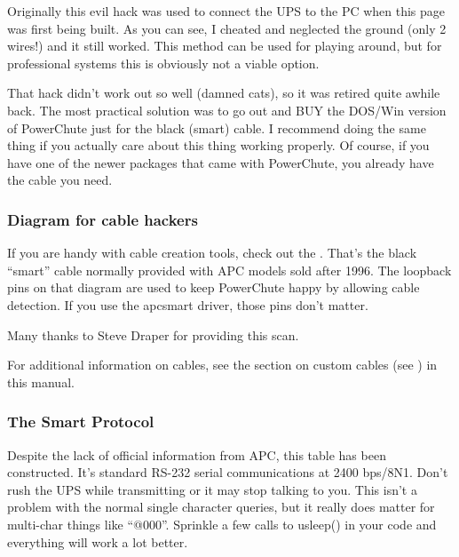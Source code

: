 {{{{{{{{{{{{{{{{{Originally this evil hack was used to connect the UPS to the PC when this page
was first being built. As you can see, I cheated and neglected the ground
(only 2 wires!) and it still worked. This method can be used for playing
around, but for professional systems this is obviously not a viable option.  

That hack didn't work out so well (damned cats), so it was retired quite
awhile back. The most practical solution was to go out and BUY the DOS/Win
version of PowerChute just for the black (smart) cable. I recommend doing the
same thing if you actually care about this thing working properly. Of course,
if you have one of the newer packages that came with PowerChute, you already
have the cable you need. 

\label{Diagram-for-cable-hackers}

\subsubsection*{Diagram for cable hackers}

If you are handy with cable creation tools, check out the 
. That's the black
``smart'' cable normally provided with APC models sold after 1996. The
loopback pins on that diagram are used to keep PowerChute happy by allowing
cable detection. If you use the 
 apcsmart driver, those pins don't
matter.  

Many thanks to Steve Draper for providing this scan.  

For additional information on cables, see the section on custom cables (see 
) in this manual. 

\label{The-Smart-Protocol}

\subsubsection*{The Smart Protocol}

Despite the lack of official information from APC, this table has been
constructed. It's standard RS-232 serial communications at 2400 bps/8N1. Don't
rush the UPS while transmitting or it may stop talking to you. This isn't a
problem with the normal single character queries, but it really does matter
for multi-char things like ``@000''. Sprinkle a few calls to usleep() in your
code and everything will work a lot better.  

}}}}}}}}}}}}}}}}}
